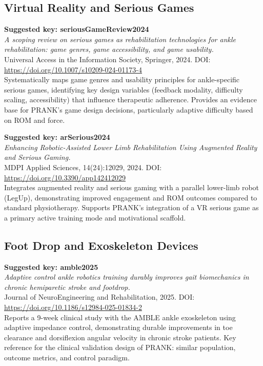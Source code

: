 \subsection*{Virtual Reality and Serious Games}

\textbf{Suggested key: seriousGameReview2024} \\
\textit{A scoping review on serious games as rehabilitation technologies for ankle rehabilitation: game genres, game accessibility, and game usability.} \\
Universal Access in the Information Society, Springer, 2024. DOI: \url{https://doi.org/10.1007/s10209-024-01173-4} \\
Systematically maps game genres and usability principles for ankle-specific serious games, identifying key design variables (feedback modality, difficulty scaling, accessibility) that influence therapeutic adherence. Provides an evidence base for PRANK's game design decisions, particularly adaptive difficulty based on ROM and force.

\textbf{Suggested key: arSerious2024} \\
\textit{Enhancing Robotic-Assisted Lower Limb Rehabilitation Using Augmented Reality and Serious Gaming.} \\
MDPI Applied Sciences, 14(24):12029, 2024. DOI: \url{https://doi.org/10.3390/app142412029} \\
Integrates augmented reality and serious gaming with a parallel lower-limb robot (LegUp), demonstrating improved engagement and ROM outcomes compared to standard physiotherapy. Supports PRANK's integration of a VR serious game as a primary active training mode and motivational scaffold.

\subsection*{Foot Drop and Exoskeleton Devices}

\textbf{Suggested key: amble2025} \\
\textit{Adaptive control ankle robotics training durably improves gait biomechanics in chronic hemiparetic stroke and footdrop.} \\
Journal of NeuroEngineering and Rehabilitation, 2025. DOI: \url{https://doi.org/10.1186/s12984-025-01834-2} \\
Reports a 9-week clinical study with the AMBLE ankle exoskeleton using adaptive impedance control, demonstrating durable improvements in toe clearance and dorsiflexion angular velocity in chronic stroke patients. Key reference for the clinical validation design of PRANK: similar population, outcome metrics, and control paradigm.

